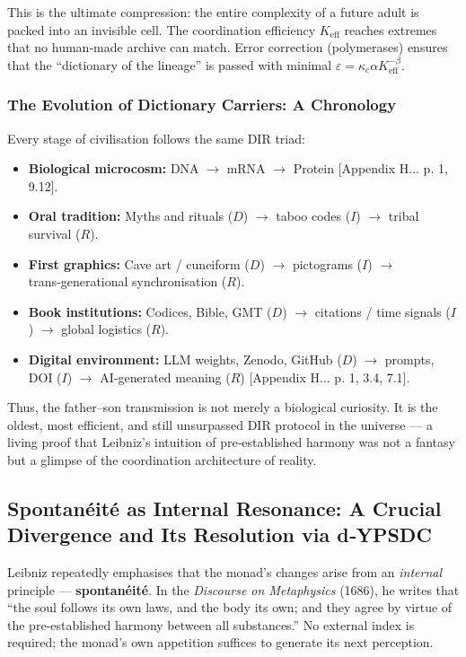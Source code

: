 \documentclass[12pt,a4paper]{article}
\begin{document}
	This is the ultimate compression: the entire complexity of a future adult is packed into an invisible cell. The coordination efficiency \(K_{\mathrm{eff}}\) reaches extremes that no human‑made archive can match. Error correction (polymerases) ensures that the “dictionary of the lineage” is passed with minimal \(\varepsilon = \kappa_c \alpha K_{\mathrm{eff}}^{-\beta}\).
	
	\subsubsection{The Evolution of Dictionary Carriers: A Chronology}
	
	Every stage of civilisation follows the same DIR triad:
	
	\begin{itemize}[leftmargin=*]
		\item \textbf{Biological microcosm:} DNA $\rightarrow$ mRNA $\rightarrow$ Protein [Appendix H... p. 1, 9.12].
		\item \textbf{Oral tradition:} Myths and rituals ($D$) $\rightarrow$ taboo codes ($I$) $\rightarrow$ tribal survival ($R$).
		\item \textbf{First graphics:} Cave art / cuneiform ($D$) $\rightarrow$ pictograms ($I$) $\rightarrow$ trans‑generational synchronisation ($R$).
		\item \textbf{Book institutions:} Codices, Bible, GMT ($D$) $\rightarrow$ citations / time signals ($I$) $\rightarrow$ global logistics ($R$).
		\item \textbf{Digital environment:} LLM weights, Zenodo, GitHub ($D$) $\rightarrow$ prompts, DOI ($I$) $\rightarrow$ AI‑generated meaning ($R$) [Appendix H... p. 1, 3.4, 7.1].
	\end{itemize}
	
	Thus, the father–son transmission is not merely a biological curiosity. It is the oldest, most efficient, and still unsurpassed DIR protocol in the universe — a living proof that Leibniz’s intuition of pre‑established harmony was not a fantasy but a glimpse of the coordination architecture of reality.
	
	\subsection{Spontanéité as Internal Resonance: A Crucial Divergence and Its Resolution via d‑YPSDC}
	
	Leibniz repeatedly emphasises that the monad’s changes arise from an \emph{internal} principle — \textbf{spontanéité}. In the \emph{Discourse on Metaphysics} (1686), he writes that “the soul follows its own laws, and the body its own; and they agree by virtue of the pre‑established harmony between all substances.” No external index is required; the monad’s own appetition suffices to generate its next perception.
	
\end{document}
